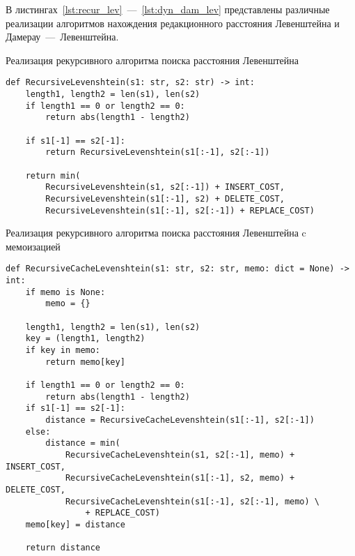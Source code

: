 В листингах~\ref{lst:recur_lev}~---~\ref{lst:dyn_dam_lev} представлены различные реализации алгоритмов нахождения редакционного расстояния Левенштейна и Дамерау~---~Левенштейна.

\begin{listing}
\caption{Реализация рекурсивного алгоритма поиска расстояния Левенштейна}
\label{lst:recur_lev}
\begin{verbatim}
def RecursiveLevenshtein(s1: str, s2: str) -> int:
    length1, length2 = len(s1), len(s2)
    if length1 == 0 or length2 == 0:
        return abs(length1 - length2)
   
    if s1[-1] == s2[-1]:
        return RecursiveLevenshtein(s1[:-1], s2[:-1])
    
    return min(
        RecursiveLevenshtein(s1, s2[:-1]) + INSERT_COST,
        RecursiveLevenshtein(s1[:-1], s2) + DELETE_COST,
        RecursiveLevenshtein(s1[:-1], s2[:-1]) + REPLACE_COST)
\end{verbatim}
\end{listing}

\begin{listing}
\caption{Реализация рекурсивного алгоритма поиска расстояния Левенштейна c мемоизацией}
\label{lst:recur_lev_cache}
\begin{verbatim}
def RecursiveCacheLevenshtein(s1: str, s2: str, memo: dict = None) -> int:
    if memo is None:
        memo = {}

    length1, length2 = len(s1), len(s2)
    key = (length1, length2)
    if key in memo:
        return memo[key]

    if length1 == 0 or length2 == 0:
        return abs(length1 - length2)
    if s1[-1] == s2[-1]:
        distance = RecursiveCacheLevenshtein(s1[:-1], s2[:-1])
    else:
        distance = min(
            RecursiveCacheLevenshtein(s1, s2[:-1], memo) + INSERT_COST,
            RecursiveCacheLevenshtein(s1[:-1], s2, memo) + DELETE_COST,
            RecursiveCacheLevenshtein(s1[:-1], s2[:-1], memo) \
                + REPLACE_COST)
    memo[key] = distance

    return distance 
\end{verbatim}
\end{listing}

